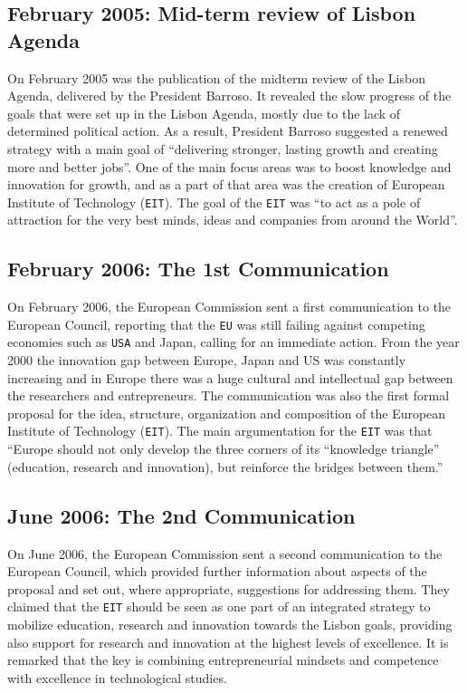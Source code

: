 \documentclass[11pt,a4paper,oneside,twocolumn]{IEEEtran}
\begin{document}
\subsection{February 2005: Mid-term review of Lisbon Agenda}
On February 2005 was the publication of the midterm review of the Lisbon Agenda, delivered by the President Barroso.
It revealed the slow progress of the goals that were set up in the Lisbon Agenda, mostly due to the lack of determined political action\cite{3_2}.
As a result, President Barroso suggested a renewed strategy with a main goal of ``delivering stronger, lasting growth and creating more and better jobs''\cite{3_3}.
One of the main focus areas was to boost knowledge and innovation for growth, and as a part of that area was the creation of European Institute of Technology (\texttt{EIT})\cite{3_3}.
The goal of the \texttt{EIT} was ``to act as a pole of attraction for the very best minds, ideas and companies from around the World''\cite{3_3}.

\subsection{February 2006: The 1st Communication}
On February 2006, the European Commission sent a first communication to the European Council, reporting that the \texttt{EU} was still failing against competing economies such as \texttt{USA} and Japan, calling for an immediate action. From the year 2000 the innovation gap between Europe, Japan and US was constantly increasing and in Europe there was a huge cultural and intellectual gap between the researchers and entrepreneurs\cite{3_4}.
The communication was also the first formal proposal for the idea, structure, organization and composition of the European Institute of Technology (\texttt{EIT}). The main argumentation for the \texttt{EIT} was that ``Europe should not only develop the three corners of its ``knowledge triangle'' (education, research and innovation), but reinforce the bridges between them.''\cite{3_4}

\subsection{June 2006: The 2nd Communication}
On June 2006, the European Commission sent a second communication to the European Council, which provided further information about aspects of the proposal and set out, where appropriate, suggestions for addressing them. They claimed that the \texttt{EIT} should be seen as one part of an integrated strategy to mobilize education, research and innovation towards the Lisbon goals, providing also support for research and innovation at the highest levels of excellence. It is remarked that the key is combining entrepreneurial mindsets and competence with excellence in technological studies\cite{3_5}.
\end{document}
